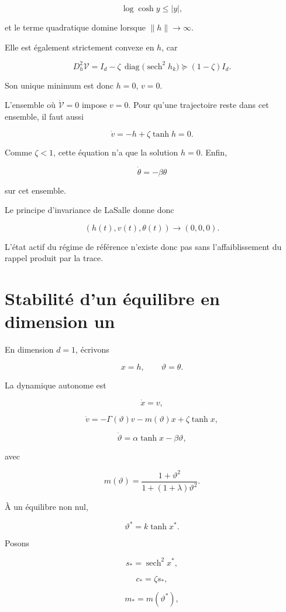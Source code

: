 \[
\log\cosh y\leq |y|,
\]

et le terme quadratique domine lorsque \(\|h\|\to\infty\).

Elle est également strictement convexe en \(h\), car

\[
D_h^2\mathcal V
=
I_d
-
\zeta\,
\operatorname{diag}
\bigl(\operatorname{sech}^2h_k\bigr)
\succeq
(1-\zeta)I_d.
\]

Son unique minimum est donc \(h=0\), \(v=0\).

L'ensemble où \(\dot{\mathcal V}=0\) impose \(v=0\). Pour qu'une
trajectoire reste dans cet ensemble, il faut aussi

\[
\dot v
=
-h+\zeta\tanh h
=
0.
\]

Comme \(\zeta<1\), cette équation n'a que la solution \(h=0\). Enfin,

\[
\dot\theta=-\beta\theta
\]

sur cet ensemble.

Le principe d'invariance de LaSalle donne donc

\[
\boxed{
(h(t),v(t),\theta(t))
\longrightarrow
(0,0,0).
}
\]

L'état actif du régime de référence n'existe donc pas sans
l'affaiblissement du rappel produit par la trace.

\section{Stabilité d'un équilibre en dimension un}
\label{annexe-reduction-stabilite-d1}

En dimension \(d=1\), écrivons

\[
x=h,
\qquad
\vartheta=\theta.
\]

La dynamique autonome est

\[
\dot x=v,
\]

\[
\dot v
=
-\Gamma(\vartheta)v
-
m(\vartheta)x
+
\zeta\tanh x,
\]

\[
\dot\vartheta
=
\alpha\tanh x-\beta\vartheta,
\]

avec

\[
m(\vartheta)
=
\frac{1+\vartheta^2}
{1+(1+\lambda)\vartheta^2}.
\]

À un équilibre non nul,

\[
\vartheta^\ast
=
k\tanh x^\ast.
\]

Posons

\[
s_\ast
=
\operatorname{sech}^2x^\ast,
\]

\[
c_\ast
=
\zeta s_\ast,
\]

\[
m_\ast
=
m(\vartheta^\ast),
\]

